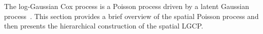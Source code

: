 \documentclass[]{interact}
\begin{document}














The log-Gaussian Cox process is a Poisson process driven by a latent Gaussian
process~\cite{moelleretal}. This section provides a brief overview of the
spatial Poisson process and then presents the hierarchical construction of the
spatial LGCP.
\end{document}

